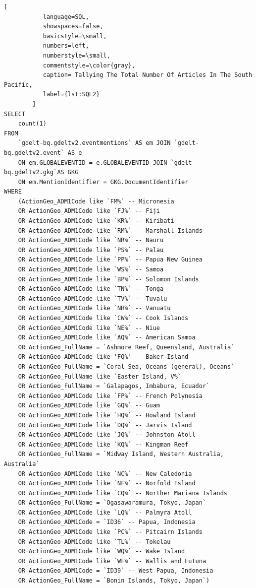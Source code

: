 \documentclass[12pt]{article}
\begin{document}
\begin{lstlisting}[
           language=SQL,
           showspaces=false,
           basicstyle=\small,
           numbers=left,
           numberstyle=\small,
           commentstyle=\color{gray},
           caption= Tallying The Total Number Of Articles In The South Pacific,
           label={lst:SQL2}
        ]
SELECT 
    count(1) 
FROM 
    `gdelt-bq.gdeltv2.eventmentions` AS em JOIN `gdelt-bq.gdeltv2.event` AS e 
    ON em.GLOBALEVENTID = e.GLOBALEVENTID JOIN `gdelt-bq.gdeltv2.gkg`AS GKG 
    ON em.MentionIdentifier = GKG.DocumentIdentifier
WHERE 
    (ActionGeo_ADM1Code like `FM%` -- Micronesia
    OR ActionGeo_ADM1Code like `FJ%` -- Fiji
    OR ActionGeo_ADM1Code like `KR%` -- Kiribati
    OR ActionGeo_ADM1Code like `RM%` -- Marshall Islands
    OR ActionGeo_ADM1Code like `NR%` -- Nauru
    OR ActionGeo_ADM1Code like `PS%` -- Palau
    OR ActionGeo_ADM1Code like `PP%` -- Papua New Guinea
    OR ActionGeo_ADM1Code like `WS%` -- Samoa
    OR ActionGeo_ADM1Code like `BP%` -- Solomon Islands
    OR ActionGeo_ADM1Code like `TN%` -- Tonga
    OR ActionGeo_ADM1Code like `TV%` -- Tuvalu
    OR ActionGeo_ADM1Code like `NH%` -- Vanuatu
    OR ActionGeo_ADM1Code like `CW%` -- Cook Islands
    OR ActionGeo_ADM1Code like `NE%` -- Niue
    OR ActionGeo_ADM1Code like `AQ%` -- American Samoa
    OR ActionGeo_FullName = `Ashmore Reef, Queensland, Australia`
    OR ActionGeo_ADM1Code like 'FQ%' -- Baker Island
    OR ActionGeo_FullName = `Coral Sea, Oceans (general), Oceans`
    OR ActionGeo_FullName like `Easter Island, V%`
    OR ActionGeo_FullName = `Galapagos, Imbabura, Ecuador`
    OR ActionGeo_ADM1Code like `FP%` -- French Polynesia
    OR ActionGeo_ADM1Code like `GQ%` -- Guam
    OR ActionGeo_ADM1Code like `HQ%` -- Howland Island
    OR ActionGeo_ADM1Code like `DQ%` -- Jarvis Island
    OR ActionGeo_ADM1Code like `JQ%` -- Johnston Atoll
    OR ActionGeo_ADM1Code like `KQ%` -- Kingman Reef
    OR ActionGeo_FullName = `Midway Island, Western Australia, Australia`
    OR ActionGeo_ADM1Code like `NC%` -- New Caledonia
    OR ActionGeo_ADM1Code like `NF%` -- Norfold Island
    OR ActionGeo_ADM1Code like `CQ%` -- Norther Mariana Islands
    OR ActionGeo_FullName = `Ogasawaramura, Tokyo, Japan`
    OR ActionGeo_ADM1Code like `LQ%` -- Palmyra Atoll
    OR ActionGeo_ADM1Code = `ID36` -- Papua, Indonesia
    OR ActionGeo_ADM1Code like `PC%` -- Pitcairn Islands
    OR ActionGeo_ADM1Code like `TL%` -- Tokelau
    OR ActionGeo_ADM1Code like `WQ%` -- Wake Island
    OR ActionGeo_ADM1Code like `WF%` -- Wallis and Futuna
    OR ActionGeo_ADM1Code = `ID39` -- West Papua, Indonesia
    OR ActionGeo_FullName = `Bonin Islands, Tokyo, Japan`)
\end{lstlisting}
\end{document}
